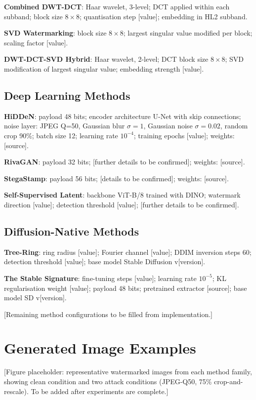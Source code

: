 ﻿\documentclass[12pt, a4paper, twoside]{report}
\numberwithin{equation}{chapter}
\begin{document}
\textbf{Combined DWT-DCT}: Haar wavelet, 3-level; DCT applied within each subband; block size $8 \times 8$; quantisation step [value]; embedding in HL2 subband.

\textbf{SVD Watermarking}: block size $8 \times 8$; largest singular value modified per block; scaling factor [value].

\textbf{DWT-DCT-SVD Hybrid}: Haar wavelet, 2-level; DCT block size $8 \times 8$; SVD modification of largest singular value; embedding strength [value].

\section{Deep Learning Methods}

\textbf{HiDDeN}: payload 48 bits; encoder architecture U-Net with skip connections; noise layer: JPEG Q=50, Gaussian blur $\sigma=1$, Gaussian noise $\sigma=0.02$, random crop 90\%; batch size 12; learning rate $10^{-4}$; training epochs [value]; weights: [source].

\textbf{RivaGAN}: payload 32 bits; [further details to be confirmed]; weights: [source].

\textbf{StegaStamp}: payload 56 bits; [details to be confirmed]; weights: [source].

\textbf{Self-Supervised Latent}: backbone ViT-B/8 trained with DINO; watermark direction [value]; detection threshold [value]; [further details to be confirmed].

\section{Diffusion-Native Methods}

\textbf{Tree-Ring}: ring radius [value]; Fourier channel [value]; DDIM inversion steps 60; detection threshold [value]; base model Stable Diffusion v[version].

\textbf{The Stable Signature}: fine-tuning steps [value]; learning rate $10^{-5}$; KL regularisation weight [value]; payload 48 bits; pretrained extractor [source]; base model SD v[version].

[Remaining method configurations to be filled from implementation.]

\chapter{Generated Image Examples}

[Figure placeholder: representative watermarked images from each method family, showing clean condition and two attack conditions (JPEG-Q50, 75\% crop-and-rescale). To be added after experiments are complete.]
\end{document}
